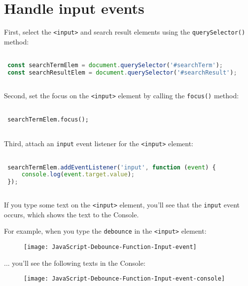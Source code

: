 \documentclass[11pt]{article}
\begin{document}
\section*{Handle input events}

First, select the \verb|<input>| and search result elements using the
\verb|querySelector()| method:

\begin{lstlisting}[language=JavaScript]

 const searchTermElem = document.querySelector('#searchTerm');
 const searchResultElem = document.querySelector('#searchResult');
 
\end{lstlisting}

\noindent
Second, set the focus on the \verb|<input>| element by calling the
\verb|focus()| method:

\begin{lstlisting}

 searchTermElem.focus();
 
\end{lstlisting}

\noindent
Third, attach an \verb|input| event listener for the \verb|<input>| element:

\begin{lstlisting}[language=JavaScript]

 searchTermElem.addEventListener('input', function (event) {
     console.log(event.target.value);
 });
 
\end{lstlisting}

\noindent
If you type some text on the \verb|<input>| element, you'll see that the
\verb|input| event occurs, which shows the text to the Console.

\noindent
For example, when you type the \verb|debounce| in the \verb|<input>| element:
\newline

\begin{figure}[h]
\centering
\texttt{[image: JavaScript-Debounce-Function-Input-event]}
\end{figure}

\newpage
\noindent
... you'll see the following texts in the Console:

\begin{figure}[h]
\centering
\texttt{[image: JavaScript-Debounce-Function-Input-event-console]}
\end{figure}
\end{document}
